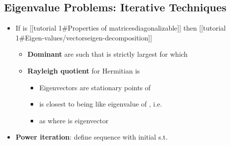 \subsection*{Eigenvalue Problems: Iterative
  Techniques}

\begin{itemize}

  \item
        If  is {[}{[}tutorial 1\#Properties of
        matrices\textbar diagonalizable{]}{]} then {[}{[}tutorial
        1\#Eigen-values/vectors\textbar eigen-decomposition{]}{]}

        \begin{itemize}

          \item
                \textbf{Dominant}  are such that
                 is strictly largest for which
          \item
                \textbf{Rayleigh quotient} for Hermitian  is

                \begin{itemize}

                  \item
                        Eigenvectors are stationary points of 
                  \item
                         is closest to being like eigenvalue
                        of ,
                        i.e.~
                  \item
                        as  where \iMbox{\nu} is eigenvector
                \end{itemize}
        \end{itemize}
  \item
        \textbf{Power iteration}: define sequence
        with initial  s.t.


\end{itemize}
